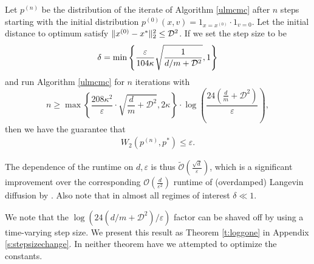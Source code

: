 \begin{theorem} \label{t:kstepconvergence}
Let $p^{(n)}$ be the distribution of the iterate of Algorithm \ref{ulmcmc} after $n$ steps starting with the initial distribution $p^{(0)}(x,v) =1_{x=x^{(0)}} \cdot 1_{v=0}$. Let the initial distance to optimum satisfy $  \lVert x^{(0)} - x^* \rVert_2^2 \le \mathcal{D}^2$. If we set the step size to be  
$$\delta = \min\left\{\frac{\varepsilon }{104\kappa} \sqrt{\frac{1}{d/m + \mathcal{D}^2}},1\right\} $$
and run Algorithm \ref{ulmcmc} for $n$ iterations with 
$$n \ge  \max\left\{\frac{208\kappa^2}{\varepsilon}\cdot\sqrt{\frac{d}{m}+\mathcal{D}^2},2\kappa\right\}\cdot \log\left( \frac{24\left(\frac{d}{m}+ \mathcal{D}^2 \right)}{\varepsilon}\right),$$
then we have the guarantee that 
\begin{align*}
W_2(p^{(n)} , p^*)\leq \varepsilon.
\end{align*}
\end{theorem}
\begin{remark}\label{r:comparetolangevin}
The dependence of the runtime on $d,\varepsilon$ is thus $\tilde{\mathcal{O}}\left(\frac{\sqrt{d}}{\varepsilon}\right)$, which is a significant improvement over the corresponding $\mathcal{O}\left(\frac{d}{\varepsilon^2}\right)$ runtime of (overdamped) Langevin diffusion by \cite{durmus}. Also note that in almost all regimes of interest $\delta \ll 1$. 
\end{remark}
We note that the $\log(24(d/m + \mathcal{D}^2)/\varepsilon)$ factor can be shaved off by using a time-varying step size. We present this result as Theorem \ref{t:loggone} in Appendix \ref{s:stepsizechange}. In neither theorem have we attempted to optimize the constants. 
